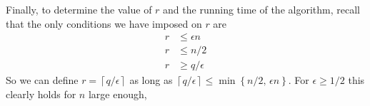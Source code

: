 \documentclass[12pt]{article}
\begin{document}
    Finally, to determine the value of $r$ and the running time of the algorithm,
    recall that the only conditions we have imposed on $r$ are
    \begin{align*}
        r & \leq \epsilon n \\
        r & \leq n/2 \\
        r & \geq q / \epsilon
    \end{align*}
    So we can define $r = \left \lceil q / \epsilon \right \rceil$
    as long as $\left \lceil q / \epsilon \right \rceil \leq \min \left\{n/2, \, \epsilon n\right\}$.
    For $\epsilon \geq 1/2$ this clearly holds for $n$ large enough,







    
    
\end{document}
